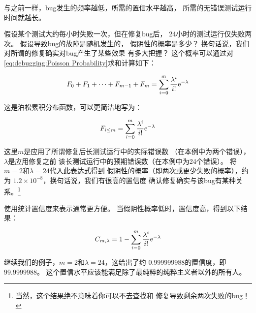 \QuickQuizEnd

与之前一样，bug发生的频率越低，所需的置信水平越高，
所需的无错误测试运行时间就越长。

假设某个测试大约每小时失败一次，但在修复bug后，
24小时的测试运行仅失败两次。
假设导致bug的故障是随机发生的，
假阴性的概率是多少？
换句话说，我们对所谓的修复确实对bug产生了某些效果
有多大把握？
这个概率可以通过对
\cref{eq:debugging:Poisson Probability}求和计算如下：

\begin{equation}
	F_0 + F_1 + \dots + F_{m - 1} + F_m =
		\sum_{i=0}^m \frac{\lambda^i}{i!} \mathrm{e}^{-\lambda}
\end{equation}

这是泊松累积分布函数，可以更简洁地写为：

\begin{equation}
	F_{i \le m} = \sum_{i=0}^m \frac{\lambda^i}{i!} \mathrm{e}^{-\lambda}
\label{eq:debugging:Possion CDF}
\end{equation}

这里$m$是应用了所谓修复后长测试运行中的实际错误数
（在本例中为两个错误），$\lambda$是应用修复之前
该长测试运行中的预期错误数（在本例中为24个错误）。
将$m=2$和$\lambda=24$代入此表达式得到
假阴性的概率（即两次或更少失败的概率），约为
$1.2 \times 10^{-8}$，换句话说，我们有很高的置信度
确认修复确实与该bug有某种关系。\footnote{
	当然，这个结果绝不意味着你可以不去查找和
	修复导致剩余两次失败的bug！}

使用统计置信度来表示通常更方便。
当假阴性概率低时，置信度高，得到以下结果：

\begin{equation}
	C_{m,\lambda} = 1 - \sum_{i=0}^m \frac{\lambda^i}{i!} \mathrm{e}^{-\lambda}
\label{eq:debugging:Possion Confidence}
\end{equation}

继续我们的例子，$m=2$和$\lambda=24$，这给出了约
0.999999988的置信度，即99.9999988\pct。
这个置信水平应该能满足除了最纯粹的纯粹主义者以外的所有人。

